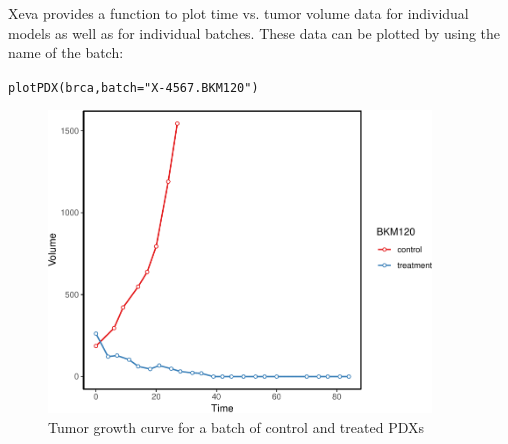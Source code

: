 \documentclass{article}\usepackage[]{graphicx}\usepackage[usenames,dvipsnames]{color}
\newcommand{\hlstr}[1]{\textcolor[rgb]{0.251,0.627,0.251}{#1}}%
\newcommand{\hlstd}[1]{\textcolor[rgb]{0.251,0.251,0.251}{#1}}%
\newcommand{\hlkwc}[1]{\textcolor[rgb]{0.251,0.251,0.251}{#1}}%
\newcommand{\hlkwd}[1]{\textcolor[rgb]{0.878,0.439,0.125}{#1}}%
\newenvironment{knitrout}{}{} %
\begin{document}
Xeva provides a function to plot time vs. tumor volume data for individual models as well as for individual batches. These data can be plotted by using the name of the batch:
\begin{knitrout}
\color{fgcolor}\begin{kframe}
\begin{alltt}
\hlkwd{plotPDX}\hlstd{(brca,} \hlkwc{batch} \hlstd{=} \hlstr{"X-4567.BKM120"}\hlstd{)}
\end{alltt}
\end{kframe}\begin{figure}
\includegraphics[width=4in]{figure/plot1-1} \caption{Tumor growth curve for a batch of control and treated PDXs}\label{fig:plot1}
\end{figure}

\end{knitrout}
\end{document}
